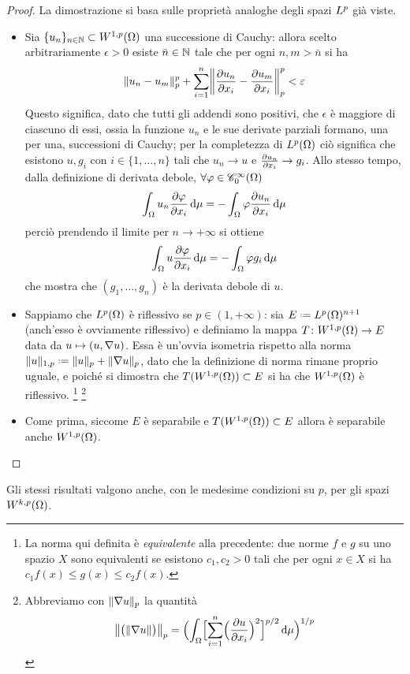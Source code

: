 \begin{proof}
    La dimostrazione si basa sulle proprietà analoghe degli spazi $\lclass[p]$ già viste.
    \begin{itemize}
        \item Sia $\{u_n\}_{n\in\N}\subset\sobW[1,p]{\Omega}$ una successione di Cauchy: allora scelto arbitrariamente $\epsilon>0$ esiste $\bar{n}\in\N$ tale che per ogni $n,m>\bar{n}$ si ha
            \begin{equation}
                \norm{u_n-u_m}_p^p+\sum_{i=1}^n\norm[\bigg]{\drp{u_n}{x_i}-\drp{u_m}{x_i}}_p^p<\epsilon
            \end{equation}
            Questo significa, dato che tutti gli addendi sono positivi, che $\epsilon$ è maggiore di ciascuno di essi, ossia la funzione $u_n$ e le sue derivate parziali formano, una per una, successioni di Cauchy; per la completezza di $\leb[p]{\Omega}$ ciò significa che esistono $u,g_i$ con $i\in\{1,\dotsc,n\}$ tali che $u_n\to u$ e $\drp{u_n}{x_i}\to g_i$.
            Allo stesso tempo, dalla definizione di derivata debole, $\forall\phi\in\contsc[\infty]{\Omega}$
            \begin{equation}
                \int_\Omega u_n\drp{\phi}{x_i}\,\dd\mu=-\int_\Omega\phi\drp{u_n}{x_i}\,\dd\mu
            \end{equation}
            perciò prendendo il limite per $n\to +\infty$ si ottiene
            \begin{equation}
                \int_\Omega u\drp{\phi}{x_i}\,\dd\mu=-\int_\Omega \phi g_i\,\dd\mu
            \end{equation}
            che mostra che $(g_1,\dotsc,g_n)$ è la derivata debole di $u$.
        \item Sappiamo che $\leb[p]{\Omega}$ è riflessivo se $p\in(1,+\infty)$: sia $E\defeq\leb[p]{\Omega}^{n+1}$ (anch'esso è ovviamente riflessivo) e definiamo la mappa $T\colon\sobW[1,p]{\Omega}\to E$ data da $u\mapsto(u,\grad u)$.
            Essa è un'ovvia isometria rispetto alla norma $\norm{u}_{1,p}\defeq\norm{u}_p+\norm{\grad u}_p$, dato che la definizione di norma rimane proprio uguale, e poich\'e si dimostra che $T(\sobW[1,p]{\Omega})\subset E$ si ha che $\sobW[1,p]{\Omega}$ è riflessivo.
            \footnote{La norma qui definita è \emph{equivalente} alla precedente: due norme $f$ e $g$ su uno spazio $X$ sono equivalenti se esistono $c_1,c_2>0$ tali che per ogni $x\in X$ si ha $c_1f(x)\le g(x)\le c_2 f(x)$.}
            \footnote{Abbreviamo con $\norm{\grad u}_p$ la quantità
            \begin{equation}
                \norm[\big]{\bigl(\norm{\grad u}\bigr)}_p=\Bigl(\int_\Omega\Bigl[\sum_{i=1}^n\Bigl(\drp{u}{x_i}\Bigr)^2\Bigr]^{p/2}\,\dd\mu\Bigr)^{1/p}
            \end{equation}}
        \item Come prima, siccome $E$ è separabile e $T(\sobW[1,p]{\Omega})\subset E$ allora è separabile anche $\sobW[1,p]{\Omega}$.\qedhere
    \end{itemize}
\end{proof}
Gli stessi risultati valgono anche, con le medesime condizioni su $p$, per gli spazi $\sobW[k,p]{\Omega}$.

